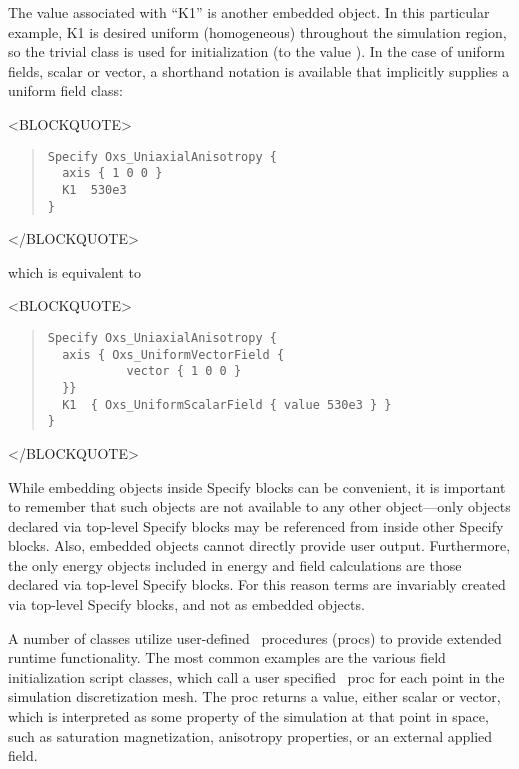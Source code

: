 \fussy
The value associated with ``K1'' is another embedded 
object.  In this particular example, K1 is desired uniform (homogeneous)
throughout the simulation region, so the trivial
 class is used for initialization (to the value
).  In the case of
uniform fields, scalar or vector, a shorthand notation is available that
implicitly supplies a uniform  field class:
\begin{rawhtml}
<BLOCKQUOTE>
\end{rawhtml}
\begin{quote}
\begin{verbatim}
Specify Oxs_UniaxialAnisotropy {
  axis { 1 0 0 }
  K1  530e3
}
\end{verbatim}
\end{quote}
\begin{rawhtml}
</BLOCKQUOTE>
\end{rawhtml}
which is equivalent to
\begin{rawhtml}
<BLOCKQUOTE>
\end{rawhtml}
\begin{quote}
\begin{verbatim}
Specify Oxs_UniaxialAnisotropy {
  axis { Oxs_UniformVectorField {
           vector { 1 0 0 }
  }}
  K1  { Oxs_UniformScalarField { value 530e3 } }
}
\end{verbatim}
\end{quote}
\begin{rawhtml}
</BLOCKQUOTE>
\end{rawhtml}

While embedding  objects inside Specify blocks can be
convenient, it is important to remember that such objects are not
available to any other  object---only objects declared via
top-level Specify blocks may be referenced from inside other
Specify blocks.  Also, embedded  objects cannot
directly provide user output.  Furthermore, the only 
energy objects included in energy and field calculations are those
declared via top-level Specify blocks.  For this reason
 terms are invariably created via top-level Specify
blocks, and not as embedded objects.

%
\label{par:supportProcs}
A number of  classes utilize user-defined \Tcl\
procedures (procs) to provide extended runtime functionality.  The
most common examples are the various field initialization script
classes, which call a user specified \Tcl\ proc for each point in the
simulation discretization mesh.  The proc returns a value, either
scalar or vector, which is interpreted as some property of the
simulation at that point in space, such as saturation magnetization,
anisotropy properties, or an external applied field.

